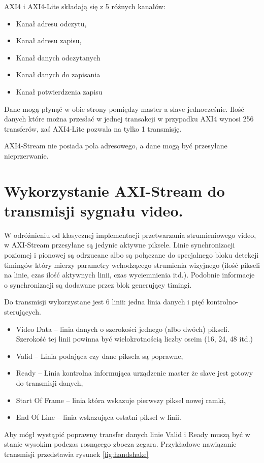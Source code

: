 AXI4 i AXI4-Lite składają się z 5 różnych kanałów:
\begin{itemize}
\item Kanał adresu odczytu,
\item Kanał adresu zapisu,
\item Kanał danych odczytanych
\item Kanał danych do zapisania
\item Kanał potwierdzenia zapisu
\end{itemize}
Dane mogą płynąć w obie strony pomiędzy master a slave jednocześnie. Ilość danych które można przesłać w jednej transakcji w przypadku AXI4 wynosi 256 transferów, zaś AXI4-Lite pozwala na tylko 1 transmisję.

AXI4-Stream nie posiada pola adresowego, a dane mogą być przesyłane nieprzerwanie. 
\section{Wykorzystanie AXI-Stream do transmisji sygnału video.} 
W odróżnieniu od klasycznej implementacji przetwarzania strumieniowego video, w AXI-Stream przesyłane są jedynie aktywne piksele. Linie synchronizacji poziomej i pionowej są odrzucane albo są połączane do specjalnego bloku detekcji timingów który mierzy parametry wchodzącego strumienia wizyjnego (ilość pikseli na linie, czas ilość aktywnych linii, czas wyciemnienia itd.). Podobnie informacje o synchronizacji są dodawane przez blok generujący timingi.

Do transmisji wykorzystane jest 6 linii: jedna linia danych i pięć kontrolno-sterujących. 
\begin{itemize}
\item Video Data – linia danych o szerokości jednego (albo dwóch) pikseli. Szerokość tej linii powinna być wielokrotnością liczby oseim (16, 24, 48 itd.)
\item Valid – Linia podająca czy dane piksela są poprawne,
\item Ready – Linia kontrolna informująca urządzenie master że slave jest gotowy do transmisji danych,
\item Start Of Frame – linia która wskazuje pierwszy piksel nowej ramki,
\item End Of Line – linia wskazująca ostatni piksel w linii.
\end{itemize}
Aby mógł wystąpić poprawny transfer danych linie Valid i Ready muszą być w stanie wysokim podczas rosnącego zbocza zegara. Przykładowe nawiązanie transmisji przedstawia rysunek \ref{fig:handshake}

